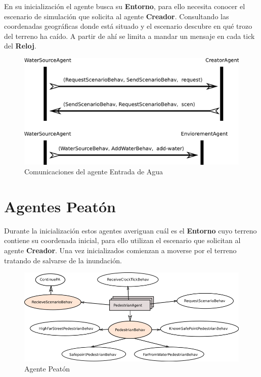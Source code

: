 En su inicialización el agente busca su {\bf Entorno}, para ello necesita
conocer el escenario de simulación que solicita al agente {\bf Creador}.
Consultando las coordenadas geográficas donde está situado y el escenario
descubre en qué trozo del terreno ha caído. A partir de ahí se limita a mandar
un mensaje en cada tick del {\bf Reloj}.

\begin{figure}[H]
 \centering
 \includegraphics[width=120mm]{figuras/cap5/com_water_source.png}
 \caption{Comunicaciones del agente Entrada de Agua}
\end{figure}

\section{Agentes Peatón}

Durante la inicialización estos agentes averiguan cuál es el {\bf Entorno} cuyo
terreno contiene su coordenada inicial, para ello utilizan el escenario que
solicitan al agente {\bf Creador}. Una vez inicializados comienzan a moverse
por el terreno tratando de salvarse de la inundación.

\begin{figure}[H]
 \centering
 \includegraphics[width=135mm]{figuras/cap5/ag_pedestrian.png}
 \caption{Agente Peatón}
\end{figure}

